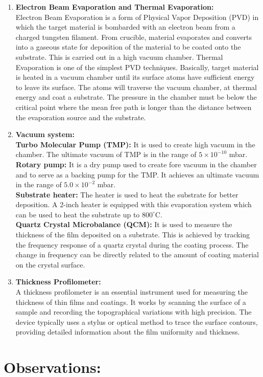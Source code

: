 \documentclass[]{report}[12 pt]
\begin{document}
	\begin{enumerate}
		\item  \textbf{Electron Beam Evaporation and Thermal Evaporation:}\\
		Electron Beam Evaporation is a 	form of Physical Vapor Deposition (PVD) in which the target material is bombarded with an electron beam from a charged tungsten filament. From crucible, material evaporates and converts into a gaseous state for deposition of the material to be coated onto the substrate. This is carried out in a high vacuum chamber. Thermal Evaporation is one of the simplest PVD techniques. Basically, target material is heated in a vacuum chamber until its surface
		atoms have sufficient energy to leave its surface. The atoms will traverse the vacuum
		chamber, at thermal energy and coat a substrate. The pressure in the chamber must be below
		the critical point where the mean free path is longer than the distance between the
		evaporation source and the substrate.
		\item \textbf{Vacuum system:}\\
		\textbf{Turbo Molecular Pump (TMP):} It is used to create high vacuum in the
		chamber. The ultimate vacuum of TMP is in the range of $5 \times 10 ^{-10}$ mbar. \\
		\textbf{Rotary pump:} It is a dry pump used to create fore vacuum in the chamber and to serve as a backing pump for the TMP. It achieves an ultimate vacuum in the range of $5.0 \times 10^{-2}$ mbar.\\ 
		\textbf{Substrate heater: }The heater is used to heat the substrate for better deposition. A 2-inch heater is equipped with this 	evaporation system which can be used to heat the substrate up to $800^{\circ}$C.\\ 
		\textbf{Quartz Crystal Microbalance (QCM): }It is used to measure the thickness of the film deposited on a substrate. This is achieved by tracking the frequency response of a quartz crystal during the coating
		process. The change in frequency can be directly related to the amount of coating material on
		the crystal surface.
		\item \textbf{Thickness Profilometer:}\\
		A thickness profilometer is an essential instrument used for
		measuring the thickness of thin films and coatings. It works by scanning the surface of a
		sample and recording the topographical variations with high precision. The device typically uses a stylus or optical method to trace the surface contours, providing detailed information 	about the film uniformity and thickness.
		
	\end{enumerate}
	\section*{Observations:}
	\begin{center}

	\end{center}
\end{document}
